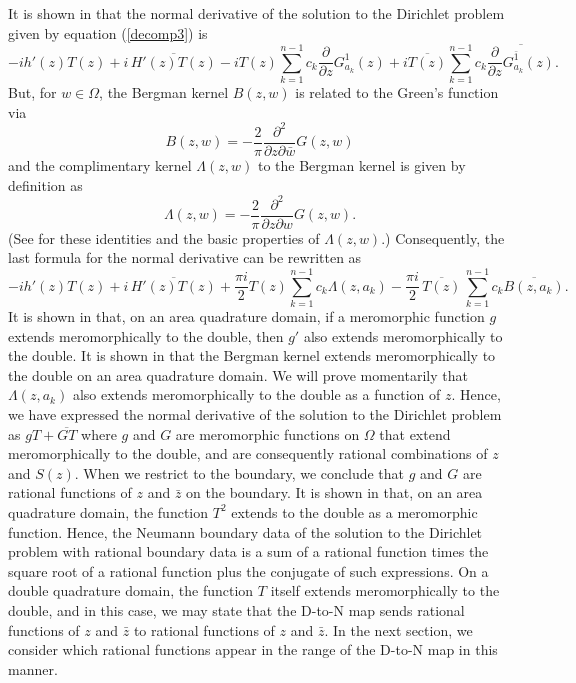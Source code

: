 \documentclass[12pt]{amsart}
\newcommand\dee{\partial}
\newcommand\Om{\Omega}
\numberwithin{equation}{section}
\begin{document}
It is shown in \cite[p.~77,~134-135]{B1} that the normal
derivative of the solution to the Dirichlet problem given
by equation (\ref{decomp3}) is
$$-ih'(z)T(z)+i\,\overline{H'(z)T(z)}-i T(z)
\sum_{k=1}^{n-1}c_k
\frac{\dee}{\dee z}
G_{a_k}^1(z)+
i \overline{T(z)}
\sum_{k=1}^{n-1}c_k
\overline{
\frac{\dee}{\dee z}
G_{a_k}^{\bar 1}(z)}.$$
But, for $w\in\Om$, the Bergman kernel $B(z,w)$ is related to
the Green's function via
$$B(z,w)=
-\frac{2}{\pi}\frac{\dee^2}{\dee z\dee\bar w}G(z,w)$$
and the complimentary kernel $\Lambda(z,w)$ to the Bergman kernel
is given by definition as
$$\Lambda(z,w)=
-\frac{2}{\pi}\frac{\dee^2}{\dee z\dee w}G(z,w).$$
(See \cite[p.~134]{B1} for these identities and the basic
properties of $\Lambda(z,w)$.) Consequently,
the last formula for the normal derivative can be rewritten as
\begin{equation}
\label{normal}
-ih'(z)T(z)+i\,\overline{H'(z)T(z)}+
\frac{\pi i}{2}  T(z) \sum_{k=1}^{n-1}c_k \Lambda(z,a_k)
-\frac{\pi i}{2}\,\overline{T(z)}\,\sum_{k=1}^{n-1}c_k
\overline{B(z,a_k)}.
\end{equation}
It is shown in \cite{B5} that, on an area quadrature domain,
if a meromorphic function $g$ extends meromorphically to the
double, then $g'$ also extends meromorphically to the double. It
is shown in \cite{B5} that the Bergman kernel extends
meromorphically to the double on an area quadrature domain.
We will prove momentarily that $\Lambda(z,a_k)$ also extends
meromorphically to the double as a function of $z$. Hence, we
have expressed
the normal derivative of the solution to the Dirichlet problem
as $gT+\overline{GT}$ where $g$ and $G$ are meromorphic functions
on $\Om$ that extend meromorphically to the double, and are
consequently rational combinations of $z$ and $S(z)$. When we
restrict to the boundary, we conclude that $g$ and $G$ are
rational functions of $z$ and $\bar z$ on the boundary. It is
shown in \cite{B5} that, on an area quadrature domain, the
function $T^2$ extends
to the double as a meromorphic function. Hence, the Neumann
boundary data of the solution to the Dirichlet problem with
rational boundary data is a sum of a rational function times
the square root of a rational function plus the conjugate of
such expressions.  On a double quadrature domain, the function
$T$ itself extends meromorphically to the double, and in this
case, we may state that the D-to-N map sends rational functions
of $z$ and $\bar z$ to rational functions of $z$ and $\bar z$.
In the next section, we consider which rational functions appear
in the range of the D-to-N map in this manner.
\end{document}
